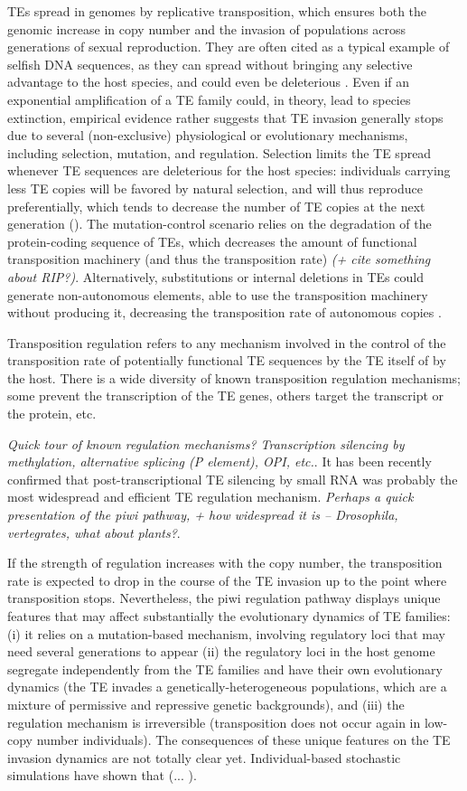 \documentclass[10pt,a4paper]{article}
\begin{document}
TEs spread in genomes by replicative transposition, which ensures both the genomic increase in copy number and the invasion of populations across generations of sexual reproduction. They are often cited as a typical example of selfish DNA sequences, as they can spread without bringing any selective advantage to the host species, and could even be deleterious \cite{OC80, DS80}. Even if an exponential amplification of a TE family could, in theory, lead to species extinction, empirical evidence rather suggests that TE invasion generally stops due to several (non-exclusive) physiological or evolutionary mechanisms, including selection, mutation, and regulation. Selection limits the TE spread whenever TE sequences are deleterious for the host species: individuals carrying less TE copies will be favored by natural selection, and will thus reproduce preferentially, which tends to decrease the number of TE copies at the next generation (\cite{CC83}). The mutation-control scenario relies on the degradation of the protein-coding sequence of TEs, which decreases the amount of functional transposition machinery (and thus the transposition rate) \cite{LC06} \emph{(+ cite something about RIP?)}. Alternatively, substitutions or internal deletions in TEs could generate non-autonomous elements, able to use the transposition machinery without producing it, decreasing the transposition rate of autonomous copies \cite{LC06, RLZ+16}. 

Transposition regulation refers to any mechanism involved in the control of the transposition rate of potentially functional TE sequences by the TE itself of by the host. There is a wide diversity of known transposition regulation mechanisms; some prevent the transcription of the TE genes, others target the  transcript or the protein, etc. 

\emph{Quick tour of known regulation mechanisms? Transcription silencing by methylation, alternative splicing (P element), OPI, etc.}. It has been recently confirmed that post-transcriptional TE silencing by small RNA was probably the most widespread and efficient TE regulation mechanism. \emph{Perhaps a quick presentation of the piwi pathway, + how widespread it is -- Drosophila, vertegrates, what about plants?}. 

If the strength of regulation increases with the copy number, the transposition rate is expected to drop in the course of the TE invasion up to the point where transposition stops. Nevertheless, the piwi regulation pathway displays unique features that may affect substantially the evolutionary dynamics of TE families: (i) it relies on a mutation-based mechanism, involving regulatory loci that may need several generations to appear (ii) the regulatory loci in the host genome segregate independently from the TE families and have their own evolutionary dynamics (the TE invades a genetically-heterogeneous populations, which are a mixture of permissive and repressive genetic backgrounds), and (iii) the regulation mechanism is irreversible (transposition does not occur again in low-copy number individuals). The consequences of these unique features on the TE invasion dynamics are not totally clear yet. Individual-based stochastic simulations have shown that (...  \cite{Kof19,KAZ18,CL10}). 
\end{document}
